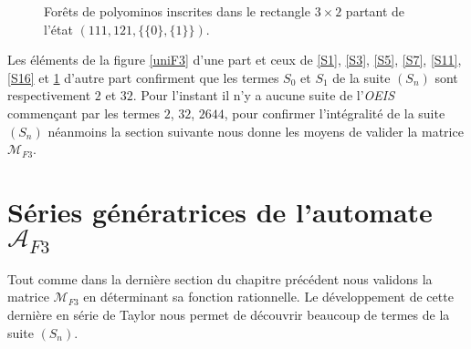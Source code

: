 \begin{figure}[!htb]
\begin{minipage}[c]{.20\linewidth}
  \centering
\begin{logicpuzzle}[rows=2,columns=3,color=cyan!100, width=750px,scale=0.5]
\framepuzzle[black!50]
\end{logicpuzzle}
\end{minipage}
\hfill
\begin{minipage}[c]{.28\linewidth}
  \centering
\begin{logicpuzzle}[rows=2,columns=3,color=cyan!100, width=750px,scale=0.5]
\framepuzzle[black!50]
\end{logicpuzzle}
\end{minipage}
\hfill
\begin{minipage}[c]{.16\linewidth}
  \centering
  \end{minipage}
\caption{\label{S20} Forêts de polyominos inscrites dans le rectangle $3\times 2$ partant de l'état $(111,121,\{\{0\},\{1\}\})$.}
\end{figure}  
\newpage

Les éléments de la figure \ref{uniF3} d'une part et ceux de \ref{S1}, \ref{S3}, \ref{S5}, \ref{S7}, \ref{S11}, \ref{S16} et \ref{S20} d'autre part confirment que les termes $S_{0}$ et $S_{1}$ de la suite $(S_{n})$ sont respectivement $2$ et $32$. Pour l'instant il n'y a aucune suite de l'\emph{OEIS} commençant par les termes $2$, $32$, $2644$, pour confirmer l'intégralité de la suite $(S_{n})$  néanmoins la section suivante nous donne les moyens de valider la matrice $\mathcal{M}_{F3}$.

\section{Séries génératrices de l'automate $\mathcal{A}_{F3}$}
Tout comme dans la dernière  section du chapitre précédent  nous validons la matrice $\mathcal{M}_{F3}$ en déterminant sa fonction rationnelle. Le développement de cette dernière en série de Taylor nous permet de découvrir beaucoup de termes de la suite $(S_{n})$.

